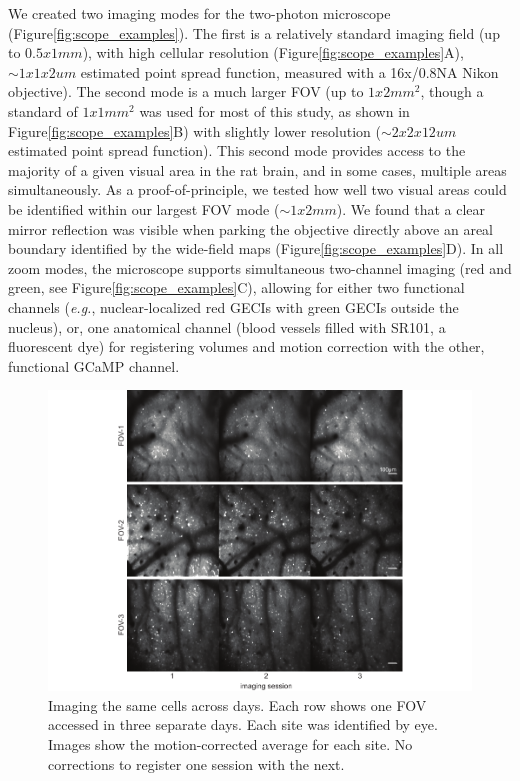 We created two imaging modes for the two-photon microscope (Figure\ref{fig:scope_examples}). The first is a relatively standard imaging field (up to $0.5x1mm$), with high cellular resolution (Figure\ref{fig:scope_examples}A), $\sim1x1x2um$ estimated point spread function, measured with a 16x/0.8NA Nikon objective). The second mode is a much larger FOV (up to $1x2mm^2$, though a standard of $1x1mm^2$ was used for most of this study, as shown in Figure\ref{fig:scope_examples}B) with slightly lower resolution ($\sim2x2x12um$ estimated point spread function). This second mode provides access to the majority of a given visual area in the rat brain, and in some cases, multiple areas simultaneously. As a proof-of-principle, we tested how well two visual areas could be identified within our largest FOV mode ($\sim1x2mm$). We found that a clear mirror reflection was visible when parking the objective directly above an areal boundary identified by the wide-field maps (Figure\ref{fig:scope_examples}D). In all zoom modes, the microscope supports simultaneous two-channel imaging (red and green, see Figure\ref{fig:scope_examples}C), allowing for either two functional channels (\textit{e.g.}, nuclear-localized red GECIs with green GECIs outside the nucleus), or, one anatomical channel (blood vessels filled with SR101, a fluorescent dye) for registering volumes and motion correction with the other, functional GCaMP channel. 

\begin{figure}[t!]
    \includegraphics[width=\textwidth]{figures/chapter_2/fig_2-8_multiday_imaging/fig_2-8_multiday_imaging.pdf}
    \vspace{.1in}
    \caption[Multi-day imaging]{Imaging the same cells across days. Each row shows one FOV accessed in three separate days. Each site was identified by eye. Images show the motion-corrected average for each site. No corrections to register one session with the next.    
    \label{fig:multiday_imaging}}
\end{figure}

